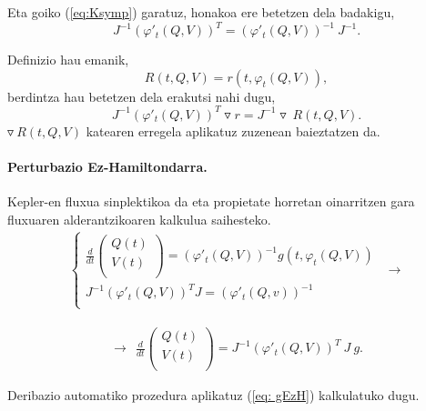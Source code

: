 Eta goiko (\ref{eq:Ksymp}) garatuz, honakoa ere betetzen dela badakigu,
\begin{equation*}
J^{-1} (\varphi'_t(Q,V))^T=(\varphi'_t(Q,V))^{-1} \ J^{-1}.
\end{equation*}

Definizio hau emanik,
\begin{equation*}
R(t,Q,V)=r(t, \varphi_t(Q,V)),
\end{equation*}
berdintza hau betetzen dela erakutsi nahi dugu,
\begin{equation*}
J^{-1} (\varphi'_t(Q,V))^T \triangledown r=J^{-1} \triangledown \ R(t,Q,V).
\end{equation*}
$\triangledown \ R(t,Q,V)$ katearen erregela aplikatuz zuzenean baieztatzen da.

\paragraph*{Perturbazio Ez-Hamiltondarra.}

Kepler-en fluxua sinplektikoa da eta propietate horretan oinarritzen gara fluxuaren alderantzikoaren kalkulua saihesteko.
\begin{align*}
         \left\{ 
            \begin{array}{l}
            \frac{d}{dt}\left(\begin{array}{c}
                            Q(t)  \\
                            V(t)  \\
            \end{array}\right)=(\varphi'_t(Q,V))^{-1} g(t, \varphi_t(Q,V)) 
             \\
            J^{-1} (\varphi'_t(Q,V))^T J=(\varphi'_t(Q,v))^{-1}   \\                          
            \end{array} 
         \right. \ \ \rightarrow
 \end{align*}
 
 \begin{align}
 \label{eq: gEzH}
\rightarrow \ \ \frac{d}{dt}\left(\begin{array}{c}
                Q(t)  \\
                V(t)  \\
\end{array}\right) =J^{-1}(\varphi'_t(Q,V))^T \ J \ g.
 \end{align}

Deribazio automatiko prozedura aplikatuz (\ref{eq: gEzH}) kalkulatuko dugu.

